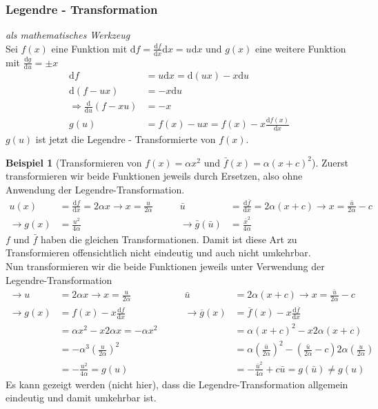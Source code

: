 \documentclass[oneside]{book}
\theoremstyle{definition}
\newtheorem*{beispiel*}{Beispiel}
\renewcommand{\d}{\mathrm d}
\newcommand{\md}{\d}
\begin{document}
\subsubsection{Legendre - Transformation} \textit{als mathematisches Werkzeug}\\
Sei $f(x)$ eine Funktion mit $\md f = \frac{\md f}{\md x} \md x = u \md x$ und $g(x)$ eine weitere Funktion mit $\frac{\md g}{\md u} = \pm x$
\begin{align*}
\md f &= u\md x = \md (ux) - x\md u\\
\md (f-ux) &= - x \md u\\
\Rightarrow \frac{\md}{\md u}(f-xu) &= -x\\
g(u) &= f(x) - ux = f(x) - x\frac{\md f(x)}{\md x}
\end{align*}
$g(u)$ ist jetzt die Legendre - Transformierte von $f(x)$.



\begin{beispiel*}[Transformieren von $f(x) = \alpha x^2$ und $\bar{f}(x) = \alpha(x+c)^2$]
	Zuerst transformieren wir beide Funktionen jeweils durch Ersetzen, also ohne Anwendung der Legendre-Transformation.
	\begin{align*}
	u(x) &= \frac{\md f}{\md x} = 2 \alpha x \rightarrow x= \frac{u}{2\alpha} & \qquad   \bar u &= \frac{\md \bar f}{\md x} = 2\alpha(x+c) \rightarrow x=\frac{\bar u}{2\alpha} - c\\
	\rightarrow g(x) &= \frac{u^2}{4\alpha} & \qquad  \rightarrow \bar g(\bar u) &= \frac{\bar x^2}{4\alpha}
	\end{align*}
	$f$ und $\bar f$ haben die gleichen Transformationen. Damit ist diese Art zu Transformieren offensichtlich nicht eindeutig und auch nicht umkehrbar.\\
	Nun transformieren wir die beide Funktionen jeweils unter Verwendung der Legendre-Transformation
	\begin{align*}
	\rightarrow u &= 2\alpha x \rightarrow x= \frac {u}{2\alpha}      &  \qquad \bar{u} &= 2\alpha (x+c) \rightarrow x= \frac {\bar{u}}{2\alpha} -c\\
	\rightarrow g(x) &= f(x) - x\frac{\md f}{\md x}  &  \qquad   \rightarrow \overline g(x) &= \overline f(x) - x\frac{\md \overline f}{\md x}\\
	&= \alpha x^2 - x2\alpha x = -\alpha x^2         &    \qquad    &= \alpha (x+c)^2 - x 2\alpha( x+c)\\
	&=-\alpha^3(\frac{u}{2\alpha})^2      &  \qquad    &= \alpha (\frac {\bar{u}}{2\alpha})^2 - (\frac {\bar u}{2\alpha} -c) 2\alpha( \frac {u}{2\alpha} )\\
	&= -\frac{u^2}{4\alpha} = g(u)   &  \qquad    &= -\frac {\bar{u}^2}{4\alpha} +c\bar{u} = g(\bar{u}) \neq g(u)
	\end{align*}
	Es kann gezeigt werden (nicht hier), dass die Legendre-Transformation allgemein eindeutig und damit umkehrbar ist.
\end{beispiel*}
\end{document}
